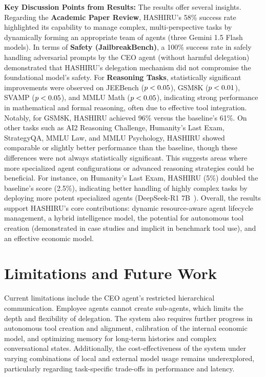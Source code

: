\documentclass[twocolumn]{article}
\newcommand{\lt}{\ensuremath <} %
\begin{document}
\textbf{Key Discussion Points from Results:}
The results offer several insights. Regarding the \textbf{Academic Paper Review}, HASHIRU's 58\% success rate highlighted its capability to manage complex, multi-perspective tasks by dynamically forming an appropriate team of agents (three Gemini 1.5 Flash~\cite{gemini15flash} models). In terms of \textbf{Safety (JailbreakBench)}, a 100\% success rate in safely handling adversarial prompts by the CEO agent (without harmful delegation) demonstrated that HASHIRU's delegation mechanism did not compromise the foundational model's safety.
For \textbf{Reasoning Tasks}, statistically significant improvements were observed on JEEBench ($p \lt 0.05$), GSM8K ($p \lt 0.01$), SVAMP ($p \lt 0.05$), and MMLU Math ($p \lt 0.05$), indicating strong performance in mathematical and formal reasoning, often due to effective tool integration. Notably, for GSM8K, HASHIRU achieved 96\% versus the baseline's 61\%. On other tasks such as AI2 Reasoning Challenge, Humanity's Last Exam, StrategyQA, MMLU Law, and MMLU Psychology, HASHIRU showed comparable or slightly better performance than the baseline, though these differences were not always statistically significant. This suggests areas where more specialized agent configurations or advanced reasoning strategies could be beneficial. For instance, on Humanity's Last Exam, HASHIRU (5\%) doubled the baseline's score (2.5\%), indicating better handling of highly complex tasks by deploying more potent specialized agents (DeepSeek-R1 7B~\cite{deepseekr1_report}).
Overall, the results support HASHIRU's core contributions: dynamic resource-aware agent lifecycle management, a hybrid intelligence model, the potential for autonomous tool creation (demonstrated in case studies and implicit in benchmark tool use), and an effective economic model.

\section{Limitations and Future Work}
\label{sec:tech_limitations_future_work}

Current limitations include the CEO agent's restricted hierarchical communication. Employee agents cannot create sub-agents, which limits the depth and flexibility of delegation. The system also requires further progress in autonomous tool creation and alignment, calibration of the internal economic model, and optimizing memory for long-term histories and complex conversational states. Additionally, the cost-effectiveness of the system under varying combinations of local and external model usage remains underexplored, particularly regarding task-specific trade-offs in performance and latency.
\end{document}

